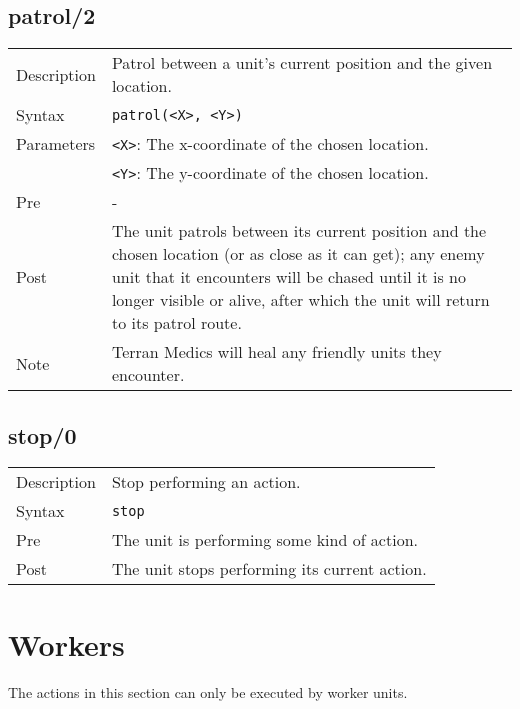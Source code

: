 \subsection{patrol/2}
\begin{tabularx}{\textwidth}{lX}
 Description & Patrol between a unit's current position and the given location. \\
 Syntax & \verb|patrol(<X>, <Y>)| \\
 Parameters & \verb|<X>|: The x-coordinate of the chosen location. \\
            &  \verb|<Y>|: The y-coordinate of the chosen location. \\
 Pre & - \\
 Post & The unit patrols between its current position and the chosen location (or as close as it can get); any enemy unit that it encounters will be chased until it is no longer visible or alive, after which the unit will return to its patrol route. \\
 Note & Terran Medics will heal any friendly units they encounter.
\end{tabularx}

\subsection{stop/0}
\begin{tabularx}{\textwidth}{lX}
 Description & Stop performing an action. \\
 Syntax & \verb|stop| \\
 Pre & The unit is performing some kind of action. \\
 Post & The unit stops performing its current action.
\end{tabularx}

\section{Workers}
The actions in this section can only be executed by worker units.

